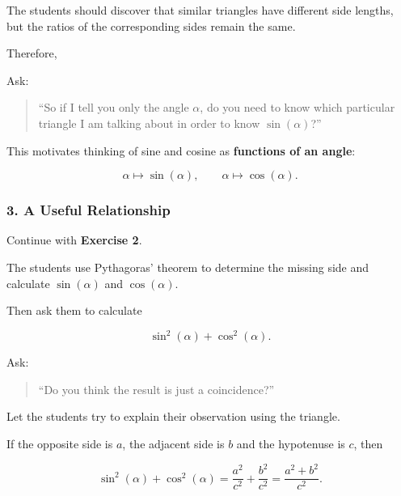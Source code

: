 \documentclass[a4paper,11pt]{article}
\begin{document}
The students should discover that similar triangles have different side
lengths, but the ratios of the corresponding sides remain the same.

Therefore,

\begin{center}
\end{center}

Ask:

\begin{quote}
    ``So if I tell you only the angle $\alpha$, do you need to know
    which particular triangle I am talking about in order to know
    $\sin(\alpha)$?''
\end{quote}

This motivates thinking of sine and cosine as \textbf{functions of an angle}:

\begin{equation}
    \alpha
    \longmapsto
    \sin(\alpha),
    \qquad
    \alpha
    \longmapsto
    \cos(\alpha).
\end{equation}


\subsubsection*{3. A Useful Relationship}

Continue with \textbf{Exercise 2}.

The students use Pythagoras' theorem to determine the missing side and
calculate $\sin(\alpha)$ and $\cos(\alpha)$.

Then ask them to calculate

\begin{equation}
    \sin^2(\alpha)+\cos^2(\alpha).
\end{equation}

Ask:

\begin{quote}
    ``Do you think the result is just a coincidence?''
\end{quote}

Let the students try to explain their observation using the triangle.

If the opposite side is $a$, the adjacent side is $b$ and the hypotenuse
is $c$, then

\begin{equation}
    \sin^2(\alpha)+\cos^2(\alpha)
    =
    \frac{a^2}{c^2}+\frac{b^2}{c^2}
    =
    \frac{a^2+b^2}{c^2}.
\end{equation}
\end{document}
